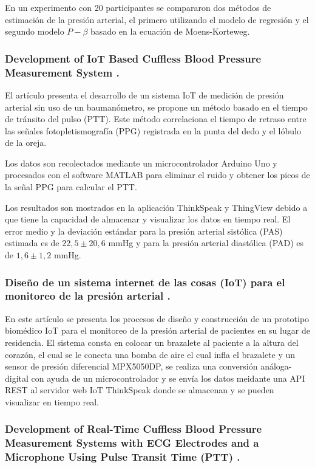     En un experimento con 20 participantes se compararon dos métodos de estimación de la presión arterial, el primero utilizando el modelo de regresión y el segundo modelo $P-\beta$ basado en la ecuación de Moens-Korteweg.

    \subsubsection*{Development of IoT Based Cuffless Blood Pressure Measurement System \cite{Norsuriati_2021}.}

    El artículo presenta el desarrollo de un sistema IoT de medición de presión arterial sin uso de un baumanómetro, se propone un método basado en el tiempo de tránsito del pulso (PTT). Este método correlaciona el tiempo de retraso entre las señales fotopletismografía (PPG) registrada en la punta del dedo y el lóbulo de la oreja.

    Los datos son recolectados mediante un microcontrolador Arduino Uno y procesados con el software MATLAB para eliminar el ruido y obtener los picos de la señal PPG para calcular el PTT.
    
    Los resultados son mostrados en la aplicación ThinkSpeak y ThingView debido a que tiene la capacidad de almacenar y visualizar los datos en tiempo real. El error medio y la deviación estándar para la presión arterial sistólica (PAS) estimada es de $22,5 \pm 20,6$ mmHg y para la presión arterial diastólica (PAD) es de $1,6 \pm 1,2$ mmHg.

    \subsubsection*{Diseño de un sistema internet de las cosas (IoT) para el monitoreo de la presión arterial \cite{Estrada_2021}. }

    En este artículo se presenta los procesos de diseño y construcción de un prototipo biomédico IoT para el monitoreo de la presión arterial de pacientes en su lugar de residencia. El sistema consta en colocar un brazalete al paciente a la altura del corazón, el cual se le conecta una bomba de aire el cual infla el brazalete y un sensor de presión diferencial MPX5050DP, se realiza una conversión análoga-digital con ayuda de un microcontrolador y se envía los datos meidante una API REST al servidor web IoT ThinkSpeak donde se almacenan y se pueden visualizar en tiempo real.

    \subsubsection*{Development of Real-Time Cuffless Blood Pressure Measurement Systems with ECG Electrodes and a Microphone Using Pulse Transit Time (PTT) \cite{Electrodes_Microphone}.}


